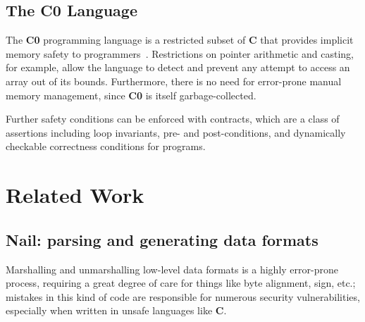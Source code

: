 \documentclass{article}
\newcommand\Kwd[1]{{\sffamily\bfseries{#1}}}
\begin{document}
\subsection*{The \Kwd{C0} Language}\label{sec:c0}

The \Kwd{C0} programming language is a restricted subset of \Kwd{C}
that provides implicit memory safety to
programmers~\citep{pfenning:c0-reference}. Restrictions on pointer
arithmetic and casting, for example, allow the language to detect and
prevent any attempt to access an array out of its bounds. Furthermore,
there is no need for error-prone manual memory management, since
\Kwd{C0} is itself garbage-collected.

Further safety conditions can be enforced with contracts, which are a
class of assertions including loop invariants, pre- and
post-conditions, and dynamically checkable correctness conditions for
programs.





\section{Related Work}

\subsection*{Nail: parsing and generating data formats}

Marshalling and unmarshalling low-level data formats
is a highly error-prone process, requiring a great degree of care for
things like byte alignment, sign, etc.; mistakes in this kind of code
are responsible for numerous security vulnerabilities, especially when
written in unsafe languages like \Kwd{C}.
\end{document}

